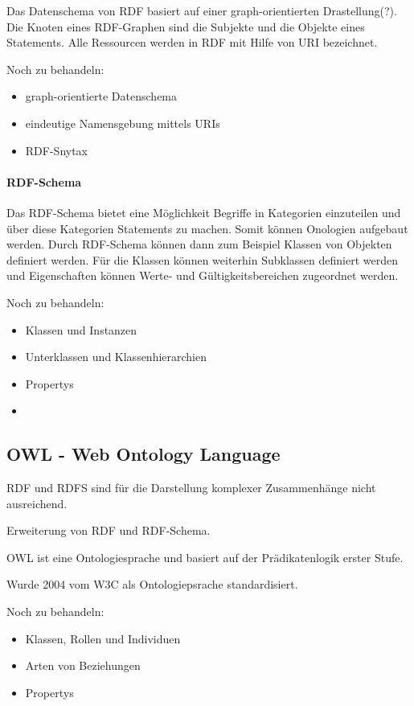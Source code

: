 Das Datenschema von \ac{RDF} basiert auf einer graph-orientierten Drastellung(?).
Die Knoten eines RDF-Graphen sind die Subjekte und die Objekte eines Statements.
Alle Ressourcen werden in RDF mit Hilfe von \ac{URI} bezeichnet.

Noch zu behandeln:
\begin{itemize}
	\item graph-orientierte Datenschema
	\item eindeutige Namensgebung mittels URIs
	\item RDF-Snytax
\end{itemize}

\paragraph{RDF-Schema} 

Das RDF-Schema bietet eine Möglichkeit Begriffe in Kategorien einzuteilen und über diese Kategorien Statements zu machen.
Somit können Onologien aufgebaut werden.
Durch RDF-Schema können dann zum Beispiel Klassen von Objekten definiert werden.
Für die Klassen können weiterhin Subklassen definiert werden und Eigenschaften können Werte- und Gültigkeitsbereichen zugeordnet werden. \citep[vgl.]{pellegrinix}

Noch zu behandeln:
\begin{itemize}
	\item Klassen und Instanzen
	\item Unterklassen und Klassenhierarchien
	\item Propertys
	\item 
\end{itemize}

\subsection{OWL - Web Ontology Language}

RDF und RDFS sind für die Darstellung komplexer Zusammenhänge nicht ausreichend.

Erweiterung von RDF und RDF-Schema. 

OWL ist eine Ontologiesprache und basiert auf der Prädikatenlogik erster Stufe.

Wurde 2004 vom W3C als Ontologiepsrache standardisiert.

Noch zu behandeln:
\begin{itemize}
	\item Klassen, Rollen und Individuen
	\item Arten von Beziehungen
	\item Propertys
\end{itemize}

